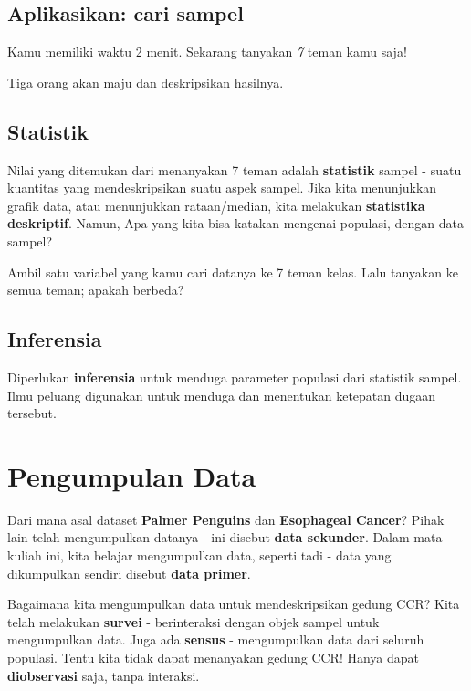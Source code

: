 \documentclass[
  letterpaper,
  DIV=11,
  numbers=noendperiod]{scrreprt}
\begin{document}
\hypertarget{aplikasikan-cari-sampel}{%
\subsection{Aplikasikan: cari sampel}\label{aplikasikan-cari-sampel}}

Kamu memiliki waktu 2 menit. Sekarang tanyakan \emph{7} teman kamu saja!

Tiga orang akan maju dan deskripsikan hasilnya.

\hypertarget{statistik}{%
\subsection{Statistik}\label{statistik}}

Nilai yang ditemukan dari menanyakan 7 teman adalah \textbf{statistik}
sampel - suatu kuantitas yang mendeskripsikan suatu aspek sampel. Jika
kita menunjukkan grafik data, atau menunjukkan rataan/median, kita
melakukan \textbf{statistika deskriptif}. Namun, Apa yang kita bisa
katakan mengenai populasi, dengan data sampel?

Ambil satu variabel yang kamu cari datanya ke 7 teman kelas. Lalu
tanyakan ke semua teman; apakah berbeda?

\hypertarget{inferensia}{%
\subsection{Inferensia}\label{inferensia}}

Diperlukan \textbf{inferensia} untuk menduga parameter populasi dari
statistik sampel. Ilmu peluang digunakan untuk menduga dan menentukan
ketepatan dugaan tersebut.

\hypertarget{pengumpulan-data}{%
\section{Pengumpulan Data}\label{pengumpulan-data}}

Dari mana asal dataset \textbf{Palmer Penguins} dan \textbf{Esophageal
Cancer}? Pihak lain telah mengumpulkan datanya - ini disebut
\textbf{data sekunder}. Dalam mata kuliah ini, kita belajar mengumpulkan
data, seperti tadi - data yang dikumpulkan sendiri disebut \textbf{data
primer}.

Bagaimana kita mengumpulkan data untuk mendeskripsikan gedung CCR? Kita
telah melakukan \textbf{survei} - berinteraksi dengan objek sampel untuk
mengumpulkan data. Juga ada \textbf{sensus} - mengumpulkan data dari
seluruh populasi. Tentu kita tidak dapat menanyakan gedung CCR! Hanya
dapat \textbf{diobservasi} saja, tanpa interaksi.
\end{document}
